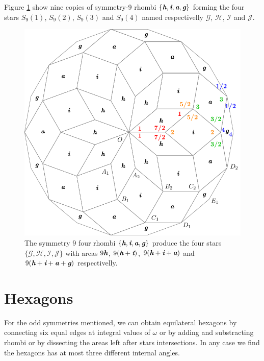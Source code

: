 \documentclass[11pt]{article}
\def\mathbi#1{\textbf{\em #1}}
\begin{document}
Figure \ref{fig:rhombi-9} show nine copies of symmetry-9 rhombi $\{\mathbi{h},\mathbi{i},\mathbi{a},\mathbi{g}\}$ forming the four stars $S_9(1)$, $S_9(2)$, $S_9(3)$ and $S_9(4)$ named respectivelly $\mathcal{G}$, $\mathcal{H}$, $\mathcal{I}$ and $\mathcal{J}$.

\begin{figure}[H]
\centering
\includegraphics[scale=1]{rhombi-9}
\caption{The symmetry $9$ four rhombi $\{\mathbi{h},\mathbi{i},\mathbi{a},\mathbi{g}\}$ produce the four stars $\{\mathcal{G},\mathcal{H},\mathcal{I},\mathcal{J}\}$ with areas
$9\mathbi{h}$,
 $9(\mathbi{h}+\mathbi{i})$,
 $9(\mathbi{h}+\mathbi{i}+\mathbi{a})$ and 
 $9(\mathbi{h}+\mathbi{i}+\mathbi{a}+\mathbi{g})$ respectivelly.}
\label{fig:rhombi-9}
\end{figure}





\section{Hexagons}

For the odd symmetries mentioned, we can obtain equilateral hexagons by connecting six equal edges at integral values of $\omega$ or by adding and substracting rhombi or by dissecting the areas left after stars intersections. In any case we find the hexagons has at most three different internal angles.
\end{document}
